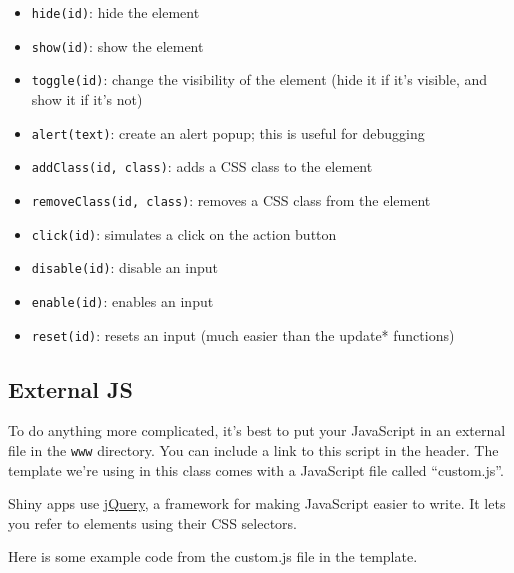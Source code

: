 \documentclass[
]{book}
\newenvironment{Shaded}{\begin{snugshade}}{\end{snugshade}}
\newcommand{\AttributeTok}[1]{\textcolor[rgb]{0.77,0.63,0.00}{#1}}
\newcommand{\FunctionTok}[1]{\textcolor[rgb]{0.00,0.00,0.00}{#1}}
\newcommand{\NormalTok}[1]{#1}
\newcommand{\SpecialCharTok}[1]{\textcolor[rgb]{0.00,0.00,0.00}{#1}}
\newcommand{\StringTok}[1]{\textcolor[rgb]{0.31,0.60,0.02}{#1}}
\providecommand{\tightlist}{%
  \setlength{\itemsep}{0pt}\setlength{\parskip}{0pt}}
\begin{document}
\begin{itemize}
\tightlist
\item
  \texttt{hide(id)}: hide the element
\item
  \texttt{show(id)}: show the element
\item
  \texttt{toggle(id)}: change the visibility of the element (hide it if it's visible, and show it if it's not)
\item
  \texttt{alert(text)}: create an alert popup; this is useful for debugging
\item
  \texttt{addClass(id,\ class)}: adds a CSS class to the element
\item
  \texttt{removeClass(id,\ class)}: removes a CSS class from the element
\item
  \texttt{click(id)}: simulates a click on the action button
\item
  \texttt{disable(id)}: disable an input
\item
  \texttt{enable(id)}: enables an input
\item
  \texttt{reset(id)}: resets an input (much easier than the update* functions)
\end{itemize}

\hypertarget{external-js}{%
\subsection{External JS}\label{external-js}}

To do anything more complicated, it's best to put your JavaScript in an external file in the \texttt{www} directory. You can include a link to this script in the header. The template we're using in this class comes with a JavaScript file called ``custom.js''.

\begin{Shaded}
\end{Shaded}

Shiny apps use \href{https://jquery.com/}{jQuery}, a framework for making JavaScript easier to write. It lets you refer to elements using their CSS selectors.

Here is some example code from the custom.js file in the template.
\end{document}
